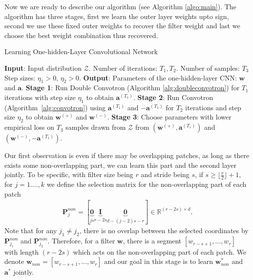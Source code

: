 \documentclass[11pt]{article}
\newcommand{\mat}[1]{\mathbf{#1}}
\newcommand{\vect}[1]{\mathbf{#1}}
\newcommand{\inputdist}{\mathcal{Z}}
\begin{document}
Now we are ready to describe our algorithm (see Algorithm \ref{algo:main}). The algorithm has three stages, first we learn the outer layer weights upto sign, second we use these fixed outer weights to recover the filter weight and last we choose the best weight combination thus recovered.

\begin{algorithm}[t]
  \caption{Learning One-hidden-Layer Convolutional Network\label{algo:main}}
  \begin{algorithmic}[1]
    \Statex \textbf{Input}: Input distribution $\inputdist$. Number of iterations: $T_1, T_2$. Number of samples: $T_3$%
    Step sizes: $\eta_1 > 0$, $\eta_2 > 0$.
   \Statex \textbf{Output}: Parameters of the one-hidden-layer CNN: $\vect{w}$ and $\vect{a}$.
     \State \textbf{Stage 1}: Run Double Convotron (Algorithm \ref{alg:doubleconvotron}) for $T_1$ iterations with step size $\eta_1$ to obtain $\vect{a}^{(T_1)}$.
     \State \textbf{Stage 2}: Run Convotron (Algorithm~\ref{alg:convotron})  using  $\vect{a}^{(T_1)}$ and $-\vect{a}^{(T_1)}$ for $T_2$ iterations and step size $\eta_2$ to obtain $\vect{w}^{(+)}$ and $\vect{w}^{(-)}$.
   \State \textbf{Stage 3}: Choose parameters with lower empirical loss on $T_3$ samples drawn from $\inputdist$ from $\left(\vect{w}^{(+)},\vect{a}^{(T_1)}\right)$ and $\left(\vect{w}^{(-)},-\vect{a}^{(T_1)}\right)$.
\end{algorithmic}
\end{algorithm}%
Our first observation is even if there may be overlapping patches, as long as there exists some non-overlapping part, we can learn this part and the second layer jointly.
To be specific, with filter size being $r$ and stride being $s$, if $s \ge \lfloor \frac{r}{2}\rfloor + 1$, for $j=1.\ldots,k$ we define the selection matrix for the non-overlapping part of each patch\begin{align*}
\mat{P}_j^{non} = 
[\underbrace{\mat{0}}_{js}  \underbrace{\mat{I}}_{r-2s}   \underbrace{\mat{0}}_{d-(j-2)s-r}] \in \mathbb{R}^{(r-2s) \times d}.
\end{align*} 
Note that for any $j_1 \neq j_2$, there is no overlap between the selected coordinates by $\mat{P}_{j_1}^{non}$ and 
$\mat{P}_{j_2}^{non}$. 
Therefore, for a filter $\vect{w}$, there is a segment $\left[w_{r-s+1},\ldots,w_{r}\right]$ with length $(r-2s)$ which acts on the non-overlapping part of each patch. 
We denote $\vect{w}_{non} = \left[w_{r-s+1},\ldots,w_{r}\right]$ and our goal in this stage is to learn $\vect{w}_{non}^*$ and $\vect{a}^*$ jointly.
\end{document}
